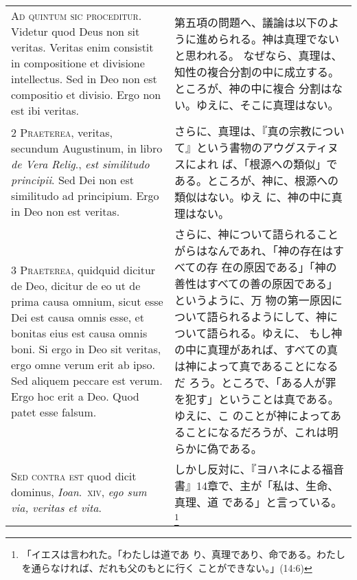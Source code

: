 \documentclass[10pt]{jsarticle} %
\begin{document}
\begin{longtable}{p{21em}p{21em}}

{\huge A}{\scshape d quintum sic proceditur}. Videtur quod Deus non
 sit veritas. Veritas enim consistit in compositione et divisione
 intellectus. Sed in Deo non est compositio et divisio. Ergo non est
 ibi veritas.


&

第五項の問題へ、議論は以下のように進められる。神は真理でないと思われる。
なぜなら、真理は、知性の複合分割の中に成立する。ところが、神の中に複合
分割はない。ゆえに、そこに真理はない。

\\

{\scshape 2 Praeterea}, veritas, secundum Augustinum, in libro
 {\itshape de Vera Relig}., {\itshape est similitudo principii}. Sed
 Dei non est similitudo ad principium. Ergo in Deo non est veritas.


&

さらに、真理は、『真の宗教について』という書物のアウグスティヌスによれ
 ば、「根源への類似」である。ところが、神に、根源への類似はない。ゆえ
 に、神の中に真理はない。

\\

{\scshape 3 Praeterea}, quidquid dicitur de Deo, dicitur de eo ut de
 prima causa omnium, sicut esse Dei est causa omnis esse, et bonitas
 eius est causa omnis boni. Si ergo in Deo sit veritas, ergo omne
 verum erit ab ipso. Sed aliquem peccare est verum. Ergo hoc erit a
 Deo. Quod patet esse falsum.

&

さらに、神について語られることがらはなんであれ、「神の存在はすべての存
 在の原因である」「神の善性はすべての善の原因である」というように、万
 物の第一原因について語られるようにして、神について語られる。ゆえに、
 もし神の中に真理があれば、すべての真は神によって真であることになるだ
 ろう。ところで、「ある人が罪を犯す」ということは真である。ゆえに、こ
 のことが神によってあることになるだろうが、これは明らかに偽である。

\\


{\scshape Sed contra est} quod dicit dominus, {\itshape
Ioan}.~{\scshape xiv}, {\itshape ego sum via, veritas et vita}.


&

しかし反対に、『ヨハネによる福音書』14章で、主が「私は、生命、真理、道
 である」と言っている。\footnote{「イエスは言われた。「わたしは道であ
 り、真理であり、命である。わたしを通らなければ、だれも父のもとに行く
 ことができない。」(14:6)}



\end{longtable}
\end{document}
